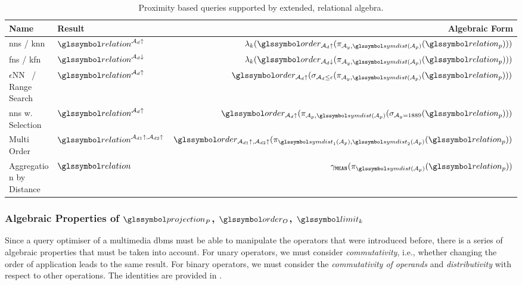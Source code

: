 \begin{table}[bt]
    \caption{Proximity based queries supported by extended, relational algebra.}
    \label{table:proximity_based_queries}
    \begin{tabular}{||l l r ||} 
     \hline
     Name & Result & Algebraic Form \\
     \hline\hline
     \acrshort{nns} / \acrshort{knn} & $\relation^{\mathcal{A}_d\uparrow}$ & $\lambda_k (\order_{\mathcal{A}_d\uparrow} ( \pi_{\mathcal{A}_{y}, \symdist(\mathcal{A}_{p})}  ( \relation_p)))$  \\ 
     \hline
     \acrshort{fns} / \acrshort{kfn}& $\relation^{\mathcal{A}_d\downarrow}$ & $\lambda_k (\order_{\mathcal{A}_d\downarrow} ( \pi_{\mathcal{A}_{y}, \symdist(\mathcal{A}_{p})}  ( \relation_p)))$   \\
     \hline
     $\epsilon$NN~\cite{Giangreco:2018Database} / Range Search & $\relation^{\mathcal{A}_d\uparrow}$ & $\order_{\mathcal{A}_d\uparrow} ( \sigma_{\mathcal{A}_d \leq \epsilon} ( \pi_{\mathcal{A}_{y}, \symdist(\mathcal{A}_{p})} ( \relation_p)) )$  \\
     \hline
     \acrshort{nns} w. Selection & $\relation^{\mathcal{A}_d\uparrow}$ &  $\order_{\mathcal{A}_d\uparrow} ( \pi_{\mathcal{A}_{p}, \symdist(\mathcal{A}_{p})} ( \sigma_{\mathcal{A}_{y} = 1889} ( \relation_p)) )$\\
     \hline
     Multi Order & $\relation^{\mathcal{A}_{d1}\uparrow,\mathcal{A}_{d2}\uparrow}$ & $\order_{\mathcal{A}_{d1}\uparrow,\mathcal{A}_{d2}\uparrow} ( \pi_{\symdist_1(\mathcal{A}_{p}), \symdist_2(\mathcal{A}_{p})}  ( \relation_p))$ \\ 
     \hline
     Aggregation by Distance & $\relation$ & $\gamma_{\texttt{MEAN}} (\pi_{\symdist(\mathcal{A}_{p})}  ( \relation_p))$\\ 
     \hline
    \end{tabular}
\end{table}

\subsubsection{Algebraic Properties of  \texorpdfstring{$\projection_{P}$}{Pi}, \texorpdfstring{$\order_{O}$}{Tau}, \texorpdfstring{$\limit_k$}{Lambda}}

Since a query optimiser of a multimedia \acrshort{dbms} must be able to manipulate the operators that were introduced before, there is a series of algebraic properties that must be taken into account. For unary operators, we must consider \emph{commutativity}, i.e., whether changing the order of application leads to the same result. For binary operators, we must consider the \emph{commutativity of operands} and \emph{distributivity} with respect to other operations. The identities are provided in .

